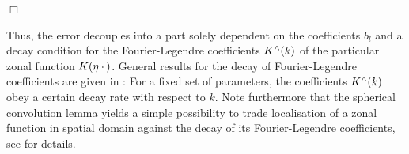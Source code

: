 \documentclass[11pt,a4paper,twoside,bibtotoc]{scrartcl}
\theoremstyle{plain}
\theoremstyle{definition}
\theoremstyle{remark}
\newenvironment{proof}{{\bf Proof.}}{$\Box$}
\newcommand{\abs}[1]{\ensuremath{\left\vert#1\right\vert}}
\newcommand{\fun}[2]{\ensuremath{#1{\hspace{-0.4ex}}\left(#2\right)}}
\newcommand{\mb}[1]{\mathbf{#1}}
\newcommand{\V}[1]{\mb{#1}}
\newcommand{\dx}{\text{\rm{d}}}
\numberwithin{equation}{section}
\numberwithin{table}{section}
\numberwithin{figure}{section}
\begin{document}
\begin{proof}
\end{proof}

Thus, the error decouples into a part solely dependent on the coefficients
$b_l$ and a decay condition for the Fourier-Legendre coefficients 
$\fun{K^{\wedge}}{k}$ of the
particular zonal function $\fun{K}{\V{\eta} \: \cdot \,}$.
General results for the decay of Fourier-Legendre coefficients are given in
\cite{Sc97,bahu01,CaFi}: For a fixed set of parameters, the coefficients
$\fun{K^{\wedge}}{k}$ obey a certain decay rate with respect to $k$.
Note furthermore that the spherical convolution lemma \cite{xxx} yields a simple
possibility to trade localisation of a zonal function in spatial domain
against the decay of its Fourier-Legendre coefficients, see \cite{Sc97} for
details.
\end{document}
